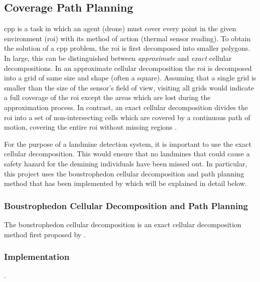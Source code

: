 \subsection{Coverage Path Planning}
\label{sec:msp_cpp}

\gls{cpp} is a task in which an agent (drone) must cover every point in the given environment (\gls{roi}) with its method of action (thermal sensor reading). To obtain the solution of a \gls{cpp} problem, the \gls{roi} is first decomposed into smaller polygons. In large, this can be distinguished between \textit{approximate} and \textit{exact} cellular decompositions. In an approximate cellular decomposition the \gls{roi} is decomposed into a grid of same size and shape (often a square). Assuming that a single grid is smaller than the size of the sensor's field of view, visiting all grids would indicate a full coverage of the \gls{roi} except the areas which are lost during the approximation process. In contrast, an exact cellular decomposition divides the \gls{roi} into a set of non-intersecting cells which are covered by a continuous path of motion, covering the entire \gls{roi} without missing regions \cite{choset2001surveycpp}. 

For the purpose of a landmine detection system, it is important to use the exact cellular decomposition. This would ensure that no landmines that could cause a safety hazard for the demining individuals have been missed out. In particular, this project uses the boustrophedon cellular decomposition and path planning method that has been implemented by \cite{bahnemann2021cpp} which will be explained in detail below.  

\subsubsection{Boustrophedon Cellular Decomposition and Path Planning}

The boustrophedon cellular decomposition is an exact cellular decomposition method first proposed by \cite{choset1998bcd}. 

\subsubsection{Implementation}

\cite{bahnemann2021cpp}.


